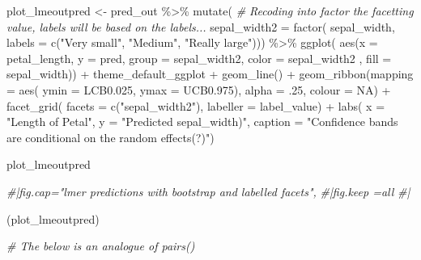 \documentclass[]{elsarticle} %
\newenvironment{Shaded}{\begin{snugshade}}{\end{snugshade}}
\newcommand{\AttributeTok}[1]{\textcolor[rgb]{0.77,0.63,0.00}{#1}}
\newcommand{\CommentTok}[1]{\textcolor[rgb]{0.56,0.35,0.01}{\textit{#1}}}
\newcommand{\ConstantTok}[1]{\textcolor[rgb]{0.00,0.00,0.00}{#1}}
\newcommand{\DecValTok}[1]{\textcolor[rgb]{0.00,0.00,0.81}{#1}}
\newcommand{\FloatTok}[1]{\textcolor[rgb]{0.00,0.00,0.81}{#1}}
\newcommand{\FunctionTok}[1]{\textcolor[rgb]{0.00,0.00,0.00}{#1}}
\newcommand{\NormalTok}[1]{#1}
\newcommand{\OtherTok}[1]{\textcolor[rgb]{0.56,0.35,0.01}{#1}}
\newcommand{\SpecialCharTok}[1]{\textcolor[rgb]{0.00,0.00,0.00}{#1}}
\newcommand{\StringTok}[1]{\textcolor[rgb]{0.31,0.60,0.02}{#1}}
\begin{document}
\begin{Shaded}
\begin{Highlighting}[]
\NormalTok{plot\_lmeoutpred }\OtherTok{\textless{}{-}} 
\NormalTok{  pred\_out }\SpecialCharTok{\%\textgreater{}\%}
    \FunctionTok{mutate}\NormalTok{( }
      \CommentTok{\# Recoding into factor the facetting value, labels will be based on the labels...}
      \AttributeTok{sepal\_width2 =} \FunctionTok{factor}\NormalTok{( sepal\_width, }\AttributeTok{labels =} \FunctionTok{c}\NormalTok{(}\StringTok{"Very small"}\NormalTok{, }
                                                     \StringTok{"Medium"}\NormalTok{, }
                                                     \StringTok{"Really large"}\NormalTok{))) }\SpecialCharTok{\%\textgreater{}\%}
    \FunctionTok{ggplot}\NormalTok{( }\FunctionTok{aes}\NormalTok{(}\AttributeTok{x =}\NormalTok{ petal\_length, }\AttributeTok{y =}\NormalTok{ pred, }
                \AttributeTok{group =}\NormalTok{ sepal\_width2, }\AttributeTok{color =}\NormalTok{ sepal\_width2}
\NormalTok{                , }\AttributeTok{fill =}\NormalTok{ sepal\_width)) }\SpecialCharTok{+}
\NormalTok{    theme\_default\_ggplot }\SpecialCharTok{+}
    \FunctionTok{geom\_line}\NormalTok{() }\SpecialCharTok{+}
    \FunctionTok{geom\_ribbon}\NormalTok{(}\AttributeTok{mapping =} \FunctionTok{aes}\NormalTok{( }\AttributeTok{ymin =}\NormalTok{ LCB0}\FloatTok{.025}\NormalTok{, }
                               \AttributeTok{ymax =}\NormalTok{ UCB0}\FloatTok{.975}\NormalTok{), }
                \AttributeTok{alpha =}\NormalTok{ .}\DecValTok{25}\NormalTok{, }
                \AttributeTok{colour =} \ConstantTok{NA}\NormalTok{) }\SpecialCharTok{+}
    \FunctionTok{facet\_grid}\NormalTok{( }\AttributeTok{facets =} \FunctionTok{c}\NormalTok{(}\StringTok{"sepal\_width2"}\NormalTok{), }\AttributeTok{labeller =}\NormalTok{ label\_value) }\SpecialCharTok{+}
    \FunctionTok{labs}\NormalTok{( }\AttributeTok{x =} \StringTok{"Length of Petal"}\NormalTok{,}
          \AttributeTok{y =} \StringTok{"Predicted sepal\_width)"}\NormalTok{,}
          \AttributeTok{caption =} \StringTok{"Confidence bands are conditional on the random effects(?)"}\NormalTok{)}

\NormalTok{plot\_lmeoutpred}

\CommentTok{\#|fig.cap="lmer predictions with bootstrap and labelled facets", }
\CommentTok{\#|fig.keep =\textquotesingle{}all\textquotesingle{}}
\CommentTok{\#|}

\NormalTok{(plot\_lmeoutpred)}


\CommentTok{\# The below is an analogue of pairs()}


\end{Highlighting}
\end{Shaded}
\end{document}
